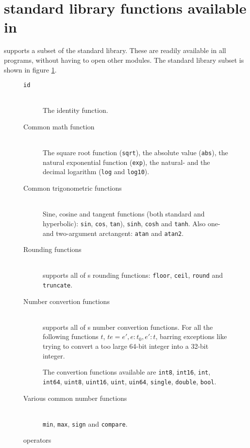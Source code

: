 \section{\fsharp{} standard library functions available in \fshark{}}
\fshark{} supports a subset of the \fsharp{} standard library. These are
readily available in all \fsharp{} programs, without having to open other modules.
The standard library subset is shown in figure \ref{fig:fsharkfuns}.
\begin{figure}[h]
  \centering
\begin{description}
\item[\texttt{id}]\hfill\\
  The identity function.

\item[Common math function]\hfill\\
  The square root function (\texttt{sqrt}), the absolute value (\texttt{abs}),
  the natural exponential function (\texttt{exp}), the natural- and the decimal
  logarithm (\texttt{log} and \texttt{log10}).
  
\item[Common trigonometric functions]\hfill\\
  Sine, cosine and tangent functions (both standard and hyperbolic):
  \texttt{sin}, \texttt{cos}, \texttt{tan}), \texttt{sinh}, \texttt{cosh} and \texttt{tanh}.
  Also one- and two-argument arctangent: \texttt{atan} and \texttt{atan2}.

\item[Rounding functions]\hfill\\
  \fshark{} supports all of \fsharp{}s rounding functions:
  \texttt{floor}, \texttt{ceil}, \texttt{round} and \texttt{truncate}.
  
\item[Number convertion functions]\hfill\\
  \fshark{} supports all of \fsharp{}s number convertion functions.
  For all the following functions $t$, $t e = e', e : t_0, e' : t$, barring
  exceptions like trying to convert a too large 64-bit integer into a 32-bit
  integer.

  The convertion functions available are \texttt{int8}, \texttt{int16}, \texttt{int}, \texttt{int64}, \texttt{uint8}, \texttt{uint16},
  \texttt{uint}, \texttt{uin64}, \texttt{single}, \texttt{double}, \texttt{bool}.
  
\item[Various common number functions]\hfill\\
  \texttt{min}, \texttt{max}, \texttt{sign} and \texttt{compare}.
\end{description}
  \caption{\fshark{} operators}
  \label{fig:fsharkfuns}
\end{figure}

